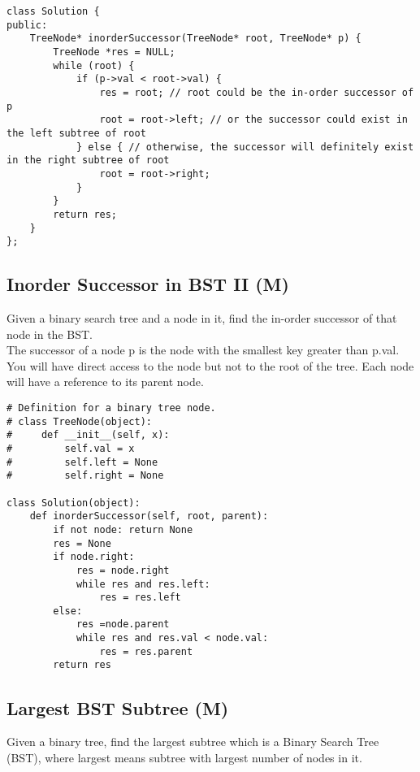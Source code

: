 \begin{lstlisting}
class Solution {
public:
    TreeNode* inorderSuccessor(TreeNode* root, TreeNode* p) {
        TreeNode *res = NULL;
        while (root) {
            if (p->val < root->val) {
                res = root; // root could be the in-order successor of p
                root = root->left; // or the successor could exist in the left subtree of root
            } else { // otherwise, the successor will definitely exist in the right subtree of root
                root = root->right; 
            }
        }
        return res;
    }
};
\end{lstlisting}

\subsection{Inorder Successor in BST II (M)}
Given a binary search tree and a node in it, find the in-order successor of that node in the BST.\\

The successor of a node p is the node with the smallest key greater than p.val.\\

You will have direct access to the node but not to the root of the tree. Each node will have a reference to its parent node.\\

\begin{lstlisting}
# Definition for a binary tree node.
# class TreeNode(object):
#     def __init__(self, x):
#         self.val = x
#         self.left = None
#         self.right = None

class Solution(object):
    def inorderSuccessor(self, root, parent):
        if not node: return None
        res = None
        if node.right:
            res = node.right
            while res and res.left:
                res = res.left
        else:
            res =node.parent
            while res and res.val < node.val:
                res = res.parent
        return res
\end{lstlisting}


\subsection{Largest BST Subtree (M)}
Given a binary tree, find the largest subtree which is a Binary Search Tree (BST), where largest means subtree with largest number of nodes in it.\\

